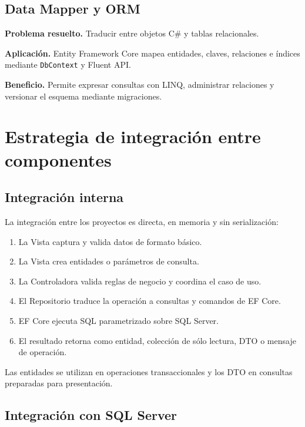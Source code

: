\documentclass[12pt,a4paper]{article}
\begin{document}
\subsection{Data Mapper y ORM}

\textbf{Problema resuelto.} Traducir entre objetos C\# y tablas relacionales.

\textbf{Aplicación.} Entity Framework Core mapea entidades, claves, relaciones
e índices mediante \texttt{DbContext} y Fluent API.

\textbf{Beneficio.} Permite expresar consultas con LINQ, administrar relaciones
y versionar el esquema mediante migraciones.


\section{Estrategia de integración entre componentes}

\subsection{Integración interna}

La integración entre los proyectos es directa, en memoria y sin serialización:

\begin{enumerate}
    \item La Vista captura y valida datos de formato básico.
    \item La Vista crea entidades o parámetros de consulta.
    \item La Controladora valida reglas de negocio y coordina el caso de uso.
    \item El Repositorio traduce la operación a consultas y comandos de EF Core.
    \item EF Core ejecuta SQL parametrizado sobre SQL Server.
    \item El resultado retorna como entidad, colección de sólo lectura, DTO o
    mensaje de operación.
\end{enumerate}

Las entidades se utilizan en operaciones transaccionales y los DTO en consultas
preparadas para presentación.

\subsection{Integración con SQL Server}
\end{document}
